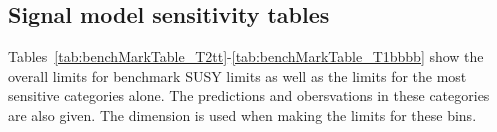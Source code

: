 \subsection{Signal model sensitivity tables}
\label{sec:lim-sum-tables}

Tables~\ref{tab:benchMarkTable_T2tt}-\ref{tab:benchMarkTable_T1bbbb} show the overall limits 
for benchmark SUSY limits as well as the limits for the most sensitive categories alone.
The predictions and obersvations in these categories are also given.
The \mht dimension is used when making the limits for these bins. 


\clearpage

\clearpage

\clearpage

\clearpage

\clearpage






